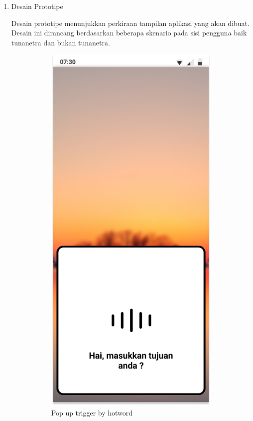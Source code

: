 \begin{enumerate}
\item Desain Prototipe
\par Desain prototipe menunjukkan perkiraan tampilan aplikasi yang akan dibuat. Desain ini dirancang berdasarkan beberapa skenario pada sisi pengguna baik tunanetra dan bukan tunanetra.

\vspace{-0cm}
	\begin{figure} [H]
	\begin{subfigure}{.5\textwidth}
  		\centering
  		\includegraphics[width=.5\linewidth]{gambar/bab3/1}  
  		\caption{Pop up trigger by hotword}
	\end{subfigure}
	\begin{subfigure}{.5\textwidth}
  		\centering

\end{subfigure}
\end{figure}
\end{enumerate}
